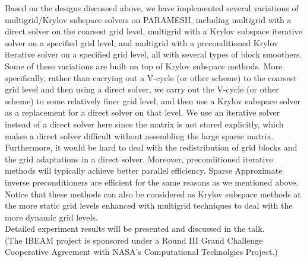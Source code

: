 \documentclass{report}
\begin{document}
Based on the designs discussed above, we have implemented several
variations of multigrid/Krylov subspace solvers on PARAMESH, including
multigrid with a direct solver on
the coarsest grid level, multigrid with a Krylov subspace iterative
solver on a specified grid level, and multigrid with a
preconditioned Krylov iterative solver on a specified grid level, all
with several types of block smoothers.
Some of these variations are built on top of Krylov subspace methods.
More specifically, rather than carrying out a V-cycle (or other scheme)
to the coarsest grid level and then using a direct solver, we carry out
the V-cycle (or other scheme) to some relatively finer grid level, and
then use a Krylov subspace solver as a replacement for a direct solver on
that level. We use an iterative solver instead of a direct solver here
since the matrix is not stored explicitly, which makes a direct solver
difficult without assembling the large sparse matrix. Furthermore, it
would be hard to deal with the
redistribution of grid blocks and the grid adaptations in a direct
solver. Moreover, preconditioned iterative
methods will typically achieve better parallel efficiency.
Sparse Approximate inverse preconditioners are efficient for the same
reasons as we mentioned above. Notice that these methods can also be
considered as Krylov subspace methods at the more static grid levels
enhanced with multigrid techniques to deal with the more dynamic grid
levels.\\

Detailed experiment results will be presented and
discussed in the talk.\\

(The IBEAM project is sponsored under a Round III Grand Challenge
Cooperative Agreement with NASA's Computational Technolgies Project.)\\
\end{document}

